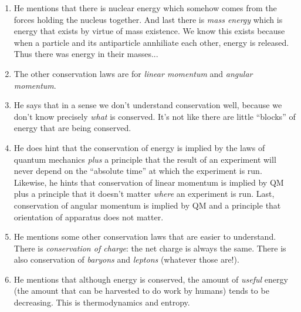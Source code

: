 \begin{enumerate}
  \item He mentions that there is nuclear energy which somehow comes
  from the forces holding the nucleus together. And last there is
  \emph{mass energy} which is energy that exists by virtue of mass
  existence. We know this exists because when a particle and its
  antiparticle annhiliate each other, energy is released. Thus there was
  energy in their masses...

  \item The other conservation laws are for \emph{linear momentum} and
  \emph{angular momentum}.

  \item He says that in a sense we don't understand conservation well,
  because we don't know precisely \emph{what} is conserved. It's not
  like there are little ``blocks'' of energy that are being conserved.

  \item He does hint that the conservation of energy is implied by the
  laws of quantum mechanics \emph{plus} a principle that the result of
  an experiment will never depend on the ``absolute time'' at which the
  experiment is run. Likewise, he hints that conservation of linear
  momentum is implied by QM plus a principle that it doesn't matter
  \emph{where} an experiment is run. Last, conservation of angular
  momentum is implied by QM and a principle that orientation of
  apparatus does not matter.

  \item He mentions some other conservation laws that are easier to
  understand. There is \emph{conservation of charge}: the net charge is
  always the same. There is also conservation of \emph{baryons} and
  \emph{leptons} (whatever those are!).

  \item He mentions that although energy is conserved, the amount of
  \emph{useful} energy (the amount that can be harvested to do work by
  humans) tends to be decreasing. This is thermodynamics and entropy.

\end{enumerate}
